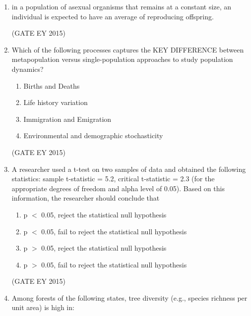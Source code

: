 \documentclass[journal,12pt,onecolumn]{IEEEtran}
\theoremstyle{remark}
\begin{document}
\begin{enumerate}
\item 

in a population of asexual organisms that remains at a constant size, an individual is expected to have an average of \underline{\hspace{1.5cm}}reproducing offspring.

\hfill{(GATE EY 2015)}

\item 
Which of the following processes captures the KEY DIFFERENCE between metapopulation versus single-population approaches to study population dynamics?

\begin{multicols}{2}
\begin{enumerate}
    
\item  Births and Deaths
\item  Life history variation
\item Immigration and Emigration
\item Environmental and demographic stochasticity

    \end{enumerate}
    \end{multicols}
\hfill{(GATE EY 2015)}


\item 
A researcher used a t-test on two samples of data and obtained the following statistics: sample t-statistic = 5.2, critical t-statistic = 2.3 (for the appropriate degrees of freedom and alpha level of 0.05). Based on this information, the researcher should conclude that


\begin{enumerate}
    
\item p $<$ 0.05, reject the statistical null hypothesis
\item p $<$ 0.05, fail to reject the statistical null hypothesis
\item p $>$ 0.05, reject the statistical null hypothesis
\item p $>$ 0.05, fail to reject the statistical null hypothesis

    \end{enumerate}
    
\hfill{(GATE EY 2015)}



\item Among forests of the following states, tree diversity (e.g., species richness per unit area) is high in:



\end{enumerate}
\end{document}

